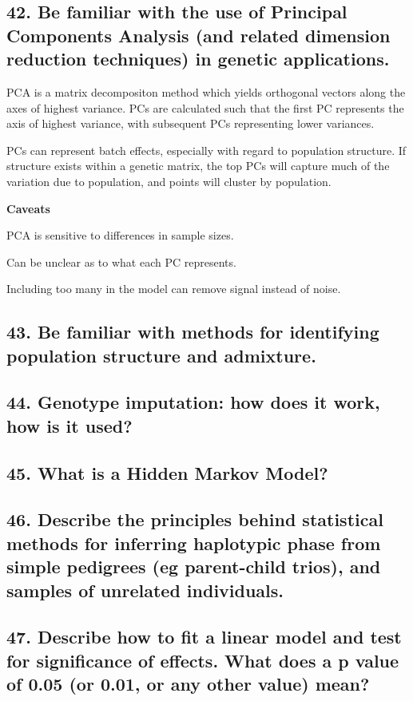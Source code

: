 \documentclass{tufte-handout}
\theoremstyle{noparens}
\begin{document}
\newpage
\subsection{42. Be familiar with the use of Principal Components Analysis (and related dimension reduction techniques) in genetic applications.}

PCA is a matrix decompositon method which yields orthogonal vectors along the axes of highest variance. PCs are calculated such that the first PC represents the axis of highest variance, with subsequent PCs representing lower variances.

PCs can represent batch effects, especially with regard to population structure. If structure exists within a genetic matrix, the top PCs will capture much of the variation due to population, and points will cluster by population. 

\textbf{Caveats}

PCA is sensitive to differences in sample sizes.

Can be unclear as to what each PC represents.

Including too many in the model can remove signal instead of noise.

\newpage
\subsection{43. Be familiar with methods for identifying population structure and admixture.}

\newpage
\subsection{44. Genotype imputation: how does it work, how is it used?}

\newpage
\subsection{45. What is a Hidden Markov Model?}

\newpage
\subsection{46. Describe the principles behind statistical methods for inferring haplotypic phase from simple pedigrees (eg parent-child trios), and samples of unrelated individuals.} 

\newpage
\subsection{47. Describe how to fit a linear model and test for significance of effects. What does a p value of 0.05 (or 0.01, or any other value) mean?} 
\end{document}

